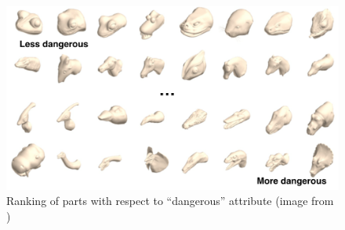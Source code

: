 \begin{figure}[tb]
\centering
    \includegraphics[width=1.0\columnwidth]{fig/search/chaudhuri_uist13_attr.png}
    \caption{
    Ranking of parts with respect to ``dangerous'' attribute (image from \protect\cite{Chaudhuri:2013:ACC}) }
    \label{fig:attribit}
\end{figure}

